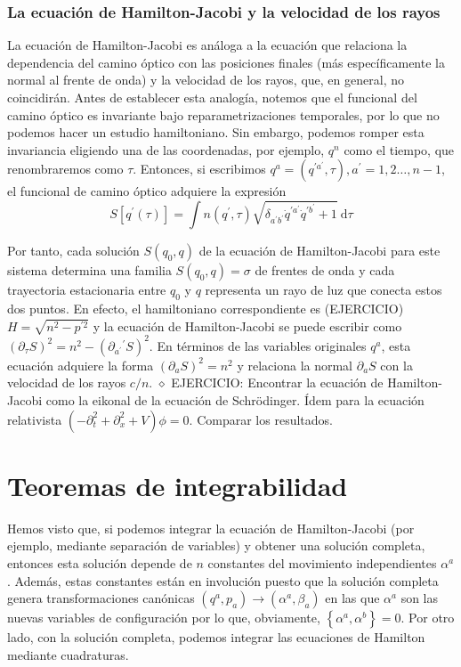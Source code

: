 \subsubsection{La ecuación de Hamilton-Jacobi y la velocidad de
los rayos}
La ecuación de Hamilton-Jacobi es análoga a la ecuación que relaciona la dependencia del camino óptico con las posiciones finales (más específicamente la normal al frente de onda) y la velocidad de los rayos, que, en general, no coincidirán. Antes de establecer esta analogía, notemos que el funcional del camino óptico es invariante bajo reparametrizaciones temporales, por lo que no podemos hacer un estudio hamiltoniano. Sin embargo, podemos romper esta invariancia eligiendo una de las coordenadas, por ejemplo, $q^{n}$ como el tiempo, que renombraremos como $\tau$. Entonces, si escribimos $q^{a}=\left(q^{\prime a^{\prime}}, \tau\right), a^{\prime}=1,2 \ldots, n-1$, el funcional de camino óptico adquiere la expresión
$$
S\left[q^{\prime}(\tau)\right]=\int n\left(q^{\prime}, \tau\right) \sqrt{\delta_{a^{\prime} b^{\prime}} \dot{q}^{\prime a^{\prime}} \dot{q}^{\prime b^{\prime}}+1} \mathrm{~d} \tau
$$

Por tanto, cada solución $S\left(q_{0}, q\right)$ de la ecuación de Hamilton-Jacobi para este sistema determina una familia $S\left(q_{0}, q\right)=\sigma$ de frentes de onda y cada trayectoria
estacionaria entre $q_{0}$ y $q$ representa un rayo de luz que conecta estos dos puntos. En efecto, el hamiltoniano correspondiente es (EJERCICIO) $H=\sqrt{n^{2}-p^{\prime 2}}$ y la ecuación de Hamilton-Jacobi se puede escribir como $\left(\partial_{\tau} S\right)^{2}=n^{2}-\left(\partial_{a^{\prime}}{ }^{\prime} S\right)^{2}$. En términos de las variables originales $q^{a}$, esta ecuación adquiere la forma $\left(\partial_{a} S\right)^{2}=n^{2}$ y relaciona la normal $\partial_{a} S$ con la velocidad de los rayos $c / n$.
$\diamond$ EJERCICIO: Encontrar la ecuación de Hamilton-Jacobi como la eikonal de la ecuación de Schrödinger. Ídem para la ecuación relativista $\left(-\partial_{t}^{2}+\partial_{x}^{2}+V\right) \phi=0$. Comparar los resultados.
\section{Teoremas de integrabilidad}
Hemos visto que, si podemos integrar la ecuación de Hamilton-Jacobi (por ejemplo, mediante separación de variables) y obtener una solución completa, entonces esta solución depende de $n$ constantes del movimiento independientes $\alpha^{a}$. Además, estas constantes están en involución puesto que la solución completa genera transformaciones canónicas $\left(q^{a}, p_{a}\right) \rightarrow\left(\alpha^{a}, \beta_{a}\right)$ en las que $\alpha^{a}$ son las nuevas variables de configuración por lo que, obviamente, $\left\{\alpha^{a}, \alpha^{b}\right\}=0$. Por otro lado, con la solución completa, podemos integrar las ecuaciones de Hamilton mediante cuadraturas.

